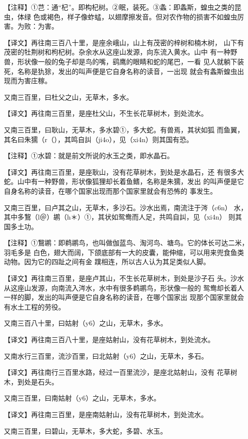 \documentclass[a4paper,12pt,UTF8,twoside]{ctexbook}
\begin{document}
【注释】①芑：通“杞”。即构杞树。②眠，装死。③螽：即螽斯，蝗虫之类的昆虫，体绿 色或褐色，样子像蚱蜢，以翅摩擦发音。但对农作物的损害不如蝗虫厉害。为败：为害。

【译文】再往南三百八十里，是座余峨山，山上有茂密的梓树和楠木树， 山下有茂密的牡荆树和枸杞树。杂余水从这座山发源，向东流入黄水。山中 有一种野兽，形状像一般的兔子却是鸟的嘴，鹞鹰的眼睛和蛇的尾巴，一看 见人就躺下装死，名称是犰狳，发出的叫声便是它自身名称的读音，一出现 就会有螽斯蝗虫出现而为害庄稼。

又南三百里，曰杜父之山，无草木，多水。

【译文】再往南三百里，是座杜父山，不生长花草树木，到处流水。

又南三百里，曰耿山，无草木，多水碧①，多大蛇。有兽焉，其状如狐 而鱼翼，其名曰朱獳（r（），其鸣自訆（ji4o），见（xi4n）则其国有恐。

【注释】①水碧：就是前文所说的水玉之类，即水晶石。

【译文】再往南三百里，是座耿山，没有花草树木，到处是水晶石，还 有很多大蛇。山中有一种野兽，形状像狐狸却长着鱼鳍，名称是朱獳，发出 的叫声便是它自身名称的读音，在哪个国家出现而那个国家里就会有恐怖的 事发生。

又南三百里，曰卢其之山，无草木，多沙石。沙水出焉，南流注于涔（c6n） 水，其中多鵹（l＠）鹕（h＊）①，其状如鸳鸯而人足，共鸣自訆，见（xi4n） 则其国多土功。

【注释】①鵹鹕：即鹈鹕鸟，也叫做伽蓝鸟、淘河鸟、塘鸟。它的体长可达二米，羽毛多是 白色，翅大而阔，下颌底部有一大的皮囊，能伸缩，可以用来兜食鱼类动物。因为它的四趾之间有金 蹼相连，所以古人认为其足类似人脚。

【译文】再往南三百里，是座卢其山，不生长花草树木，到处是沙子石 头。沙水从这座山发源，向南流入涔水，水中有很多鹈鹕鸟，形状像一般的 鸳鸯却长着人一样的脚，发出的叫声便是它自身名称的读音，在哪个国家出 现那个国家里就会有水土工程的劳役。

又南三百八十里，曰姑射（y6）之山，无草木，多水。

【译文】再往南三百八十里，是座姑射山，没有花草树木，到处流水。

又南水行三百里，流沙百里，曰北姑射（y6）之山，无草木，多石。

【译文】再往南行三百里水路，经过一百里流沙，是座北姑射山，没有 花草树木，到处是石头。

又南三百里，曰南姑射（y6）之山，无草木，多水。

【译文】再往南三百里，是座南姑射山，没有花草树木，到处流水。

又南三百里，曰碧山，无草木，多大蛇，多碧、水玉。
\end{document}
